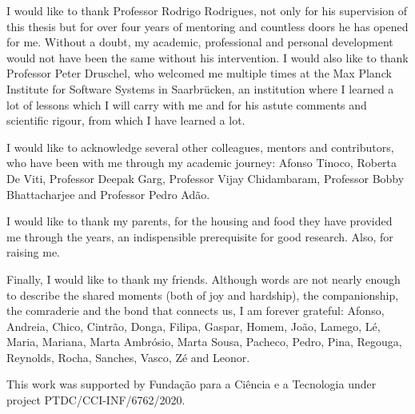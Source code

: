 
\noindent I would like to thank Professor Rodrigo
Rodrigues, not only for his supervision of this thesis but for
over four years of mentoring and countless doors he has opened for me.
Without a doubt, my academic, professional and
personal development would not have been the same without his
intervention. I would also like to thank Professor Peter
Druschel, who welcomed me multiple times at the Max Planck
Institute for Software Systems in Saarbrücken, an institution
where I learned a lot of lessons which I will carry with me and
for his astute comments and scientific rigour, from which I have
learned a lot.

I would like to acknowledge several other colleagues, mentors and
contributors, who have been with me through my
academic journey: Afonso Tinoco, Roberta De Viti, Professor
Deepak Garg, Professor Vijay Chidambaram, Professor Bobby
Bhattacharjee and Professor Pedro Adão.

I would like to thank my parents, for the housing and food they
have provided me through the years, an indispensible prerequisite for good
research. Also, for raising me.

Finally, I would like to thank my friends. Although words are not
nearly enough to describe the shared moments (both of joy and
hardship), the companionship, the comraderie and the bond that
connects us, I am forever grateful: Afonso, Andreia, Chico,
Cintrão, Donga, Filipa, Gaspar, Homem, João, Lamego, Lé, Maria, Mariana, Marta Ambrósio,
Marta Sousa, Pacheco, Pedro, Pina, Regouga, Reynolds, Rocha,
Sanches, Vasco, Zé and Leonor.

This work was supported by Fundação para a Ciência e a Tecnologia
under project PTDC/CCI-INF/6762/2020.
